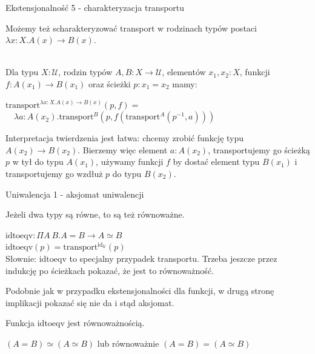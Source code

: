 \documentclass{beamer}
\newcommand{\U}{\mathcal{U}}
\newcommand{\id}{\text{id}}
\newcommand{\inv}[1]{#1^{-1}}
\newcommand{\transport}{\text{transport}}
\newcommand{\idtoeqv}{\text{idtoeqv}}
\begin{document}
\begin{frame}{Ekstensjonalność 5 - charakteryzacja transportu}

Możemy też scharakteryzować transport w rodzinach typów postaci $\lambda x : X. A(x) \to B(x)$. \\~\

Dla typu $X : \U$, rodzin typów $A, B : X \to \U$, elementów $x_1, x_2 : X$, funkcji $f : A(x_1) \to B(x_1)$ oraz ścieżki $p : x_1 = x_2$ mamy:

\begin{theorem}
$\transport^{\lambda x : X. A(x) \to B(x)}(p, f) =$ \\
$\quad \lambda a : A(x_2). \transport^B(p, f(\transport^A(\inv{p}, a)))$
\end{theorem}

Interpretacja twierdzenia jest łatwa: chcemy zrobić funkcję typu $A(x_2) \to B(x_2)$. Bierzemy więc element $a : A(x_2)$, transportujemy go ścieżką $p$ w tył do typu $A(x_1)$, używamy funkcji $f$ by dostać element typu $B(x_1)$ i transportujemy go wzdłuż $p$ do typu $B(x_2)$.

\end{frame}

\begin{frame}{Uniwalencja 1 - aksjomat uniwalencji}

Jeżeli dwa typy są równe, to są też równoważne.

\begin{definition}[2.10.2]
$\idtoeqv: \Pi A\ B. A = B \to A \simeq B$ \\
$\idtoeqv(p) = \transport^{\id_\U}(p)$ \\

Słownie: $\idtoeqv$ to specjalny przypadek transportu. Trzeba jeszcze przez indukcję po ścieżkach pokazać, że jest to równoważność.
\end{definition}

Podobnie jak w przypadku ekstensjonalności dla funkcji, w drugą stronę implikacji pokazać się nie da i stąd aksjomat.

\begin{definition}
Funkcja $\idtoeqv$ jest równoważnością.
\end{definition}

\begin{corollary}
$(A = B) \simeq (A \simeq B)$ lub równoważnie $(A = B) = (A \simeq B)$
\end{corollary}

\end{frame}
\end{document}
